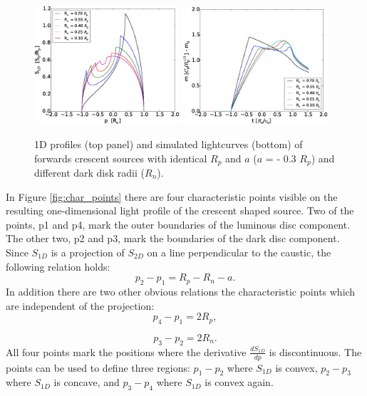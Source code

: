\documentclass[usenatbib]{mn2e}
\begin{document}
\begin{figure}
\centering
    \includegraphics[width = 0.48\textwidth]{figures/S1D_var_rn_a_neg.eps}
    \includegraphics[width = 0.48\textwidth]{figures/5Rn_forw_var_magnification.eps}
\caption{\label{fig:lightcurve_crescent} 1D profiles (top panel) and simulated lightcurves (bottom) 
of forwards crescent sources with identical $R_p$ and $a$ ($a$ = - 0.3 $R_p$) and different dark disk radii ($R_n$). }
\end{figure}

In Figure \ref{fig:char_points} there are four characteristic points visible on the resulting one-dimensional 
light profile of the crescent shaped source. Two of the points, p1 and p4, mark the outer boundaries of the
 luminous disc component. The other two, p2 and p3, mark the boundaries of the dark disc component. 
Since $S_{1D}$ is a projection of $S_{2D}$ on a line perpendicular to the caustic, the following relation holds:
\begin{equation}
    p_2-p_1 = R_p -R_n - a.
\end{equation}
In addition there are two other obvious relations the characteristic points which are independent of the projection:
\begin{equation}
    p_4 -p_1 = 2 R_p,
\end{equation}

\begin{equation}
        p_3 -p_2 = 2 R_n.
\end{equation}
All four points mark the positions where the derivative $\frac{dS_{1D}}{dp}$ is discontinuous. The points can be used 
to define three regions: $p_1 - p_2$ where $S_{1D}$ is convex, $p_2 - p_3$ where $S_{1D}$ is concave, 
and $p_3 - p_4$ where $S_{1D}$ is convex again. \\
\end{document}
